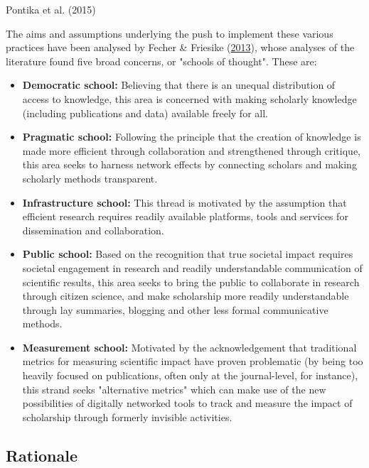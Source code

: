 \documentclass{article}
\begin{document}
Pontika et al. (2015)


The aims and assumptions underlying the push to implement these various practices have been analysed by Fecher \& Friesike (\href{https://papers.ssrn.com/sol3/papers.cfm?abstract_id=2272036}{2013}), whose analyses of the literature found five broad concerns, or "schools of thought". These are:

\begin{itemize}
\item \textbf{Democratic school:} Believing that there is an unequal distribution of access to knowledge, this area is concerned with making scholarly knowledge (including publications and data) available freely for all.


\item \textbf{Pragmatic school:} Following the principle that the creation of knowledge is made more efficient through collaboration and strengthened through critique, this area seeks to harness network effects by connecting scholars and making scholarly methods transparent.


\item \textbf{Infrastructure school:} This thread is motivated by the assumption that efficient research requires readily available platforms, tools and services for dissemination and collaboration.


\item \textbf{Public school:} Based on the recognition that true societal impact requires societal engagement in research and readily understandable communication of scientific results, this area seeks to bring the public to collaborate in research through citizen science, and make scholarship more readily understandable through lay summaries, blogging and other less formal communicative methods.


\item \textbf{Measurement school:} Motivated by the acknowledgement that traditional metrics for measuring scientific impact have proven problematic (by being too heavily focused on publications, often only at the journal-level, for instance), this strand seeks "alternative metrics" which can make use of the new possibilities of digitally networked tools to track and measure the impact of scholarship through formerly invisible activities.


\end{itemize}

\subsection{Rationale}\label{rationale}
\end{document}

